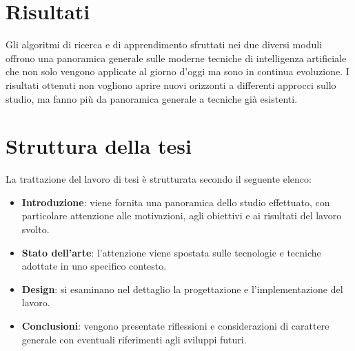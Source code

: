 \section{Risultati}
Gli algoritmi di ricerca e di apprendimento sfruttati nei due diversi moduli offrono una panoramica generale sulle moderne tecniche di intelligenza
artificiale che non solo vengono applicate al giorno d'oggi ma sono in continua evoluzione. I risultati ottenuti non vogliono aprire nuovi
orizzonti a differenti approcci sullo studio, ma fanno più da panoramica generale a tecniche già esistenti.

\section{Struttura della tesi}
La trattazione del lavoro di tesi è strutturata secondo il seguente elenco:
\begin{itemize}
    \item \textbf{Introduzione}: viene fornita una panoramica dello studio effettuato, con particolare attenzione alle motivazioni, 
    agli obiettivi e ai risultati del lavoro svolto.
    \item \textbf{Stato dell'arte}: l'attenzione viene spostata sulle tecnologie e tecniche adottate in uno specifico contesto.
    \item \textbf{Design}: si esaminano nel dettaglio la progettazione e l'implementazione del lavoro.
    \item \textbf{Conclusioni}: vengono presentate riflessioni e considerazioni di carattere generale con eventuali riferimenti
    agli sviluppi futuri.
\end{itemize}
